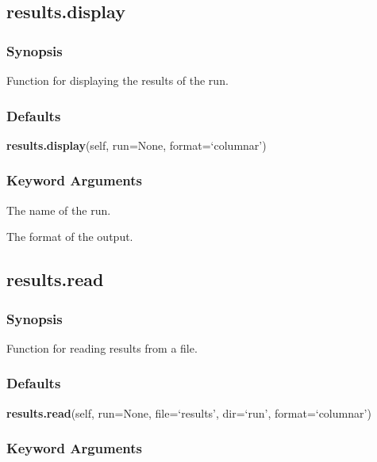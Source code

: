 \subsection{results.display}


\subsubsection{Synopsis}

Function for displaying the results of the run.



\subsubsection{Defaults}

\textsf{\textbf{results.display}(self, run=None, format=`columnar')}


\subsubsection{Keyword Arguments}

  The name of the run. 

  The format of the output. 





\newpage

\subsection{results.read}


\subsubsection{Synopsis}

Function for reading results from a file.



\subsubsection{Defaults}

\textsf{\textbf{results.read}(self, run=None, file=`results', dir=`run', format=`columnar')}


\subsubsection{Keyword Arguments}

